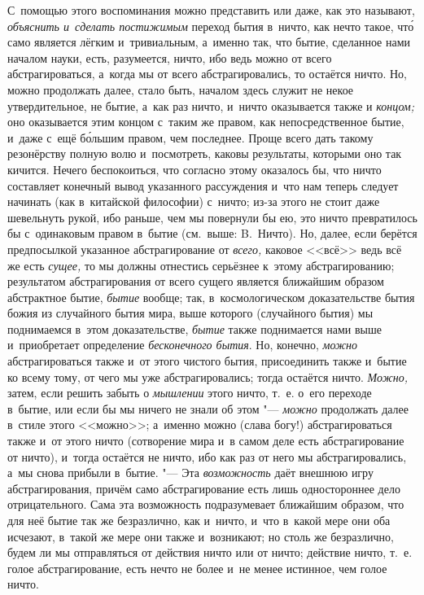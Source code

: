 С~помощью этого воспоминания можно представить или даже, как это называют,
{\em объяснить и~сделать постижимым} переход бытия в~ничто, как нечто такое,
чт\'{о} само является лёгким и~тривиальным, а~именно так, что бытие, сделанное
нами началом науки, есть, разумеется, ничто, ибо ведь можно от всего
абстрагироваться, а~когда мы от всего абстрагировались, то остаётся ничто. Но,
можно продолжать далее, стало быть, началом здесь служит не некое
утвердительное, не бытие, а~как раз ничто, и~ничто оказывается также и
{\em концом;} оно оказывается этим концом с~таким же правом, как
непосредственное бытие, и~даже с~ещё б\'{о}льшим правом, чем последнее. Проще
всего дать такому резонёрству полную волю и~посмотреть,
каковы результаты, которыми оно так кичится. Нечего
беспокоиться, что согласно этому оказалось бы, что ничто составляет конечный
вывод указанного рассуждения и~что нам теперь следует начинать (как в~китайской
философии) с~ничто; из-за этого не стоит даже шевельнуть рукой, ибо раньше, чем
мы повернули бы ею, это ничто превратилось бы с~одинаковым правом в~бытие
(см.~выше: B.~Ничто). Но, далее, если берётся предпосылкой указанное
абстрагирование от {\em всего,} каковое <<всё>> ведь всё же есть {\em сущее,}
то мы должны отнестись серьёзнее к~этому абстрагированию; результатом
абстрагирования от всего сущего является ближайшим образом абстрактное бытие,
{\em бытие} вообще; так, в~космологическом доказательстве бытия божия из
случайного бытия мира, выше которого (случайного бытия) мы поднимаемся в~этом
доказательстве, {\em бытие} также поднимается нами выше и~приобретает
определение {\em бесконечного бытия}. Но, конечно, {\em можно} абстрагироваться
также и~от этого чистого бытия, присоединить также и~бытие ко всему тому, от
чего мы уже абстрагировались; тогда остаётся ничто. {\em Можно,} затем, если
решить забыть о {\em мышлении} этого ничто, т.~е. о~его переходе в~бытие, или
если бы мы ничего не знали об этом "--- {\em можно} продолжать далее в~стиле
этого <<можно>>; а~именно можно (слава богу!) абстрагироваться также и~от этого
ничто (сотворение мира и~в самом деле есть абстрагирование от ничто), и~тогда
остаётся не ничто, ибо как раз от него мы абстрагировались, а~мы снова прибыли
в~бытие. "--- Эта {\em возможность} даёт внешнюю игру абстрагирования,
причём само абстрагирование есть лишь одностороннее дело отрицательного. Сама
эта возможность подразумевает ближайшим образом, что для неё бытие так же
безразлично, как и~ничто, и~что в~какой мере они оба исчезают, в~такой же мере
они также и~возникают; но столь же безразлично, будем ли мы отправляться от
действия ничто или от ничто; действие ничто, т.~е. голое абстрагирование, есть
нечто не более и~не менее истинное, чем голое ничто.

